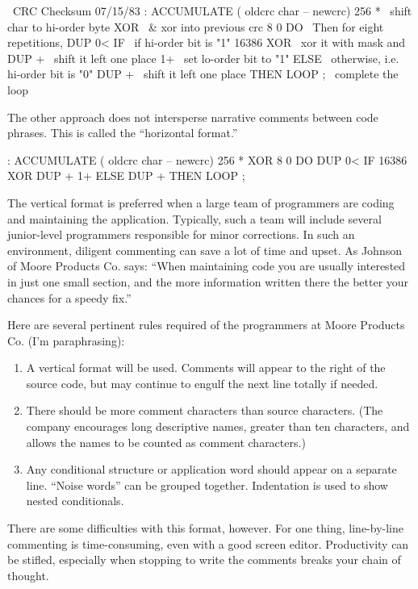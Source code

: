 \begin{Code}
\ CRC Checksum                                      07/15/83
: ACCUMULATE   ( oldcrc char -- newcrc)
   256 *               \ shift char to hi-order byte
   XOR                 \ & xor into previous crc
   8 0 DO              \ Then for eight repetitions,
       DUP 0< IF       \ if hi-order bit is "1"
          16386 XOR    \ xor it with mask and
          DUP +        \ shift it left one place
          1+           \ set lo-order bit to "1"
              ELSE     \ otherwise, i.e. hi-order bit is "0"
          DUP +        \ shift it left one place
              THEN
       LOOP ;          \ complete the loop
\end{Code}
The other approach does not intersperse narrative comments between
code phrases.  This is called the ``horizontal format.''
\begin{Code}
: ACCUMULATE  ( oldcrc char -- newcrc)
   256 *  XOR  8 0 DO  DUP 0< IF
      16386 XOR  DUP +  1+  ELSE  DUP +  THEN  LOOP ;
\end{Code}
The vertical format is preferred when a large team of programmers are
coding and maintaining the application.  Typically, such a team will
include several junior-level programmers responsible for minor
corrections.  In such an environment, diligent commenting can save a
lot of time and upset.  As Johnson of Moore
Products Co.  says: ``When maintaining code you are usually interested
in just one small section, and the more information written there the
better your chances for a speedy fix.''

Here are several pertinent rules required of the \Forth{} programmers
at Moore Products Co. (I'm paraphrasing):

\begin{enumerate}
\item A vertical format will be used.  Comments will appear to the
right of the source code, but may continue to engulf the next line
totally if needed.
\item There should be more comment characters than source characters.
(The company encourages long descriptive names, greater than ten
characters, and allows the names to be counted as comment characters.)
\item Any conditional structure or application word should appear on a
separate line.  ``Noise words'' can be grouped together.  Indentation
is used to show nested conditionals.
\end{enumerate}
There are some difficulties with this format, however.%
For one thing, line-by-line commenting is time-consuming, even with a
good screen editor.  Productivity can be stifled, especially when
stopping to write the comments breaks your chain of thought.

